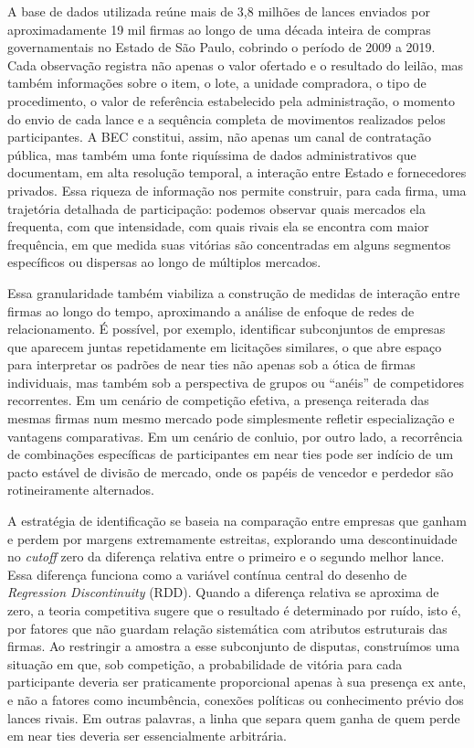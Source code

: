 \documentclass[12pt,a4paper]{article}
\begin{document}
A base de dados utilizada reúne mais de 3,8 milhões de lances enviados por aproximadamente 19 mil firmas ao longo de uma década inteira de compras governamentais no Estado de São Paulo, cobrindo o período de 2009 a 2019. Cada observação registra não apenas o valor ofertado e o resultado do leilão, mas também informações sobre o item, o lote, a unidade compradora, o tipo de procedimento, o valor de referência estabelecido pela administração, o momento do envio de cada lance e a sequência completa de movimentos realizados pelos participantes. A BEC constitui, assim, não apenas um canal de contratação pública, mas também uma fonte riquíssima de dados administrativos que documentam, em alta resolução temporal, a interação entre Estado e fornecedores privados. Essa riqueza de informação nos permite construir, para cada firma, uma trajetória detalhada de participação: podemos observar quais mercados ela frequenta, com que intensidade, com quais rivais ela se encontra com maior frequência, em que medida suas vitórias são concentradas em alguns segmentos específicos ou dispersas ao longo de múltiplos mercados.

Essa granularidade também viabiliza a construção de medidas de interação entre firmas ao longo do tempo, aproximando a análise de enfoque de redes de relacionamento. É possível, por exemplo, identificar subconjuntos de empresas que aparecem juntas repetidamente em licitações similares, o que abre espaço para interpretar os padrões de near ties não apenas sob a ótica de firmas individuais, mas também sob a perspectiva de grupos ou ``anéis'' de competidores recorrentes. Em um cenário de competição efetiva, a presença reiterada das mesmas firmas num mesmo mercado pode simplesmente refletir especialização e vantagens comparativas. Em um cenário de conluio, por outro lado, a recorrência de combinações específicas de participantes em near ties pode ser indício de um pacto estável de divisão de mercado, onde os papéis de vencedor e perdedor são rotineiramente alternados.

A estratégia de identificação se baseia na comparação entre empresas que ganham e perdem por margens extremamente estreitas, explorando uma descontinuidade no \textit{cutoff} zero da diferença relativa entre o primeiro e o segundo melhor lance. Essa diferença funciona como a variável contínua central do desenho de \textit{Regression Discontinuity} (RDD). Quando a diferença relativa se aproxima de zero, a teoria competitiva sugere que o resultado é determinado por ruído, isto é, por fatores que não guardam relação sistemática com atributos estruturais das firmas. Ao restringir a amostra a esse subconjunto de disputas, construímos uma situação em que, sob competição, a probabilidade de vitória para cada participante deveria ser praticamente proporcional apenas à sua presença ex ante, e não a fatores como incumbência, conexões políticas ou conhecimento prévio dos lances rivais. Em outras palavras, a linha que separa quem ganha de quem perde em near ties deveria ser essencialmente arbitrária.
\end{document}
